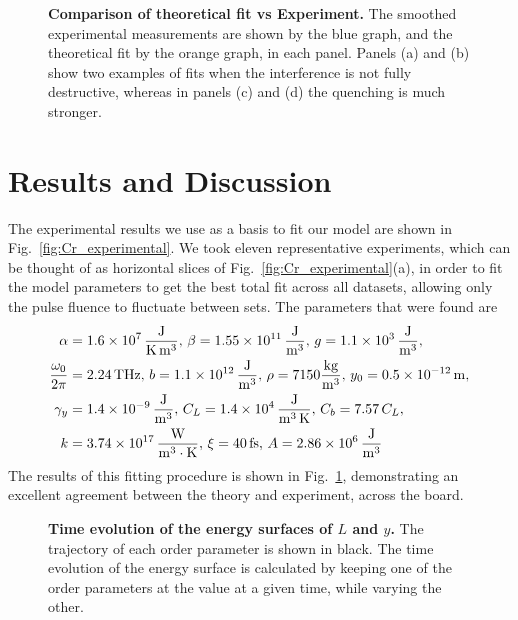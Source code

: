 \begin{figure}[h]
\caption{\label{fig:Cr_theoretical_fit} {\bf Comparison of theoretical fit vs Experiment.} The smoothed experimental measurements are shown by the blue graph, and the theoretical fit by the orange graph, in each panel. Panels (a) and (b) show two examples of fits when the interference is not fully destructive, whereas in panels (c) and (d) the quenching is much stronger.}
\end{figure}
\section{Results and Discussion \label{sec:Cr_results}}
The experimental results we use as a basis to fit our model are shown in Fig.~\ref{fig:Cr_experimental}.
We took eleven representative experiments, which can be thought of as horizontal slices of Fig.~\ref{fig:Cr_experimental}(a), in order to fit the model parameters to get the best total fit across all datasets, allowing only the pulse fluence to fluctuate between sets.
The parameters that were found are
\begin{align}
	\alpha &= \SI{1.6e7} {\rm \frac{J}{K\, m^3}},\, \beta = \SI{1.55e11} {\rm \frac{J}{m^3}},\, g = \SI{1.1e3}{\rm \frac{J}{m^3}}, \\
	\frac{\omega_0}{2\pi} &= 2.24\, {\rm THz},\, b = \SI{1.1e12} {\rm \frac{J}{m^3}},\, \rho = 7150 {\rm \frac{kg}{m^3}},\, y_0 = \SI{0.5e-12} {\rm m},\\
	\gamma_y &= \SI{1.4e-9}{\rm \frac{J}{m^3}}, \, C_L = \SI{1.4e4}{\rm \frac{J}{m^3\,K}},\, C_b = 7.57\,C_L,\\
	k &= \SI{3.74e17} {\rm \frac{W}{m^3\cdot K}},\, \xi = 40\,{\rm fs},\,A = \SI{2.86e6}{\rm \frac{J}{m^3}}
\end{align}
The results of this fitting procedure is shown in Fig.~\ref{fig:Cr_theoretical_fit}, demonstrating an excellent agreement between the theory and experiment, across the board.
\begin{figure}[h]
	\begin{subfigure}{0.5\textwidth}
	\end{subfigure}
	\begin{subfigure}{0.5\textwidth}
	\end{subfigure}
	\caption{\label{fig:Cr_energy_surfaces}{\bf Time evolution of the energy surfaces of $L$ and $y$.} The trajectory of each order parameter is shown in black. The time evolution of the energy surface is calculated by keeping one of the order parameters at the value at a given time, while varying the other.}
\end{figure}
